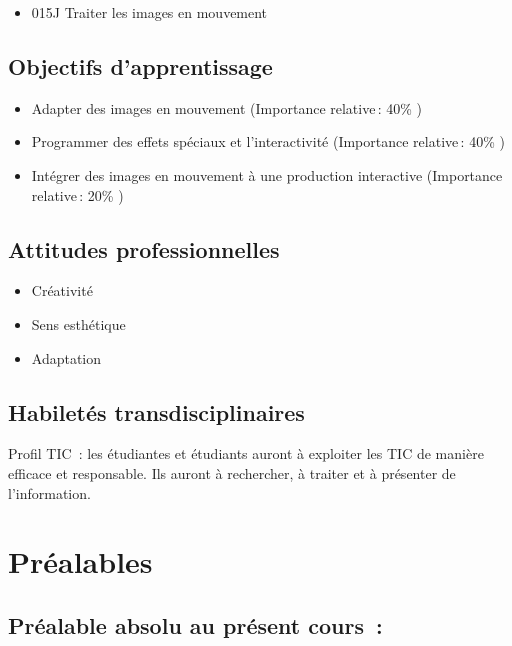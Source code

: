 \documentclass[
]{book}
\providecommand{\tightlist}{%
  \setlength{\itemsep}{0pt}\setlength{\parskip}{0pt}}
\begin{document}
\begin{itemize}
\tightlist
\item
  015J Traiter les images en mouvement
\end{itemize}

\hypertarget{objectifs-dapprentissage}{%
\subsection{Objectifs d'apprentissage}\label{objectifs-dapprentissage}}

\begin{itemize}
\tightlist
\item
  Adapter des images en mouvement (Importance relative\,: 40\% )
\item
  Programmer des effets spéciaux et l'interactivité (Importance relative\,: 40\% )
\item
  Intégrer des images en mouvement à une production interactive (Importance relative\,: 20\% )
\end{itemize}

\hypertarget{attitudes-professionnelles}{%
\subsection{Attitudes professionnelles}\label{attitudes-professionnelles}}

\begin{itemize}
\tightlist
\item
  Créativité
\item
  Sens esthétique
\item
  Adaptation
\end{itemize}

\hypertarget{habiletuxe9s-transdisciplinaires}{%
\subsection{Habiletés transdisciplinaires}\label{habiletuxe9s-transdisciplinaires}}

Profil TIC~: les étudiantes et étudiants auront à exploiter les TIC de manière efficace et responsable. Ils auront à rechercher, à traiter et à présenter de l'information.

\hypertarget{pruxe9alables}{%
\section{Préalables}\label{pruxe9alables}}

\hypertarget{pruxe9alable-absolu-au-pruxe9sent-cours}{%
\subsection{Préalable absolu au présent cours~:}\label{pruxe9alable-absolu-au-pruxe9sent-cours}}
\end{document}
